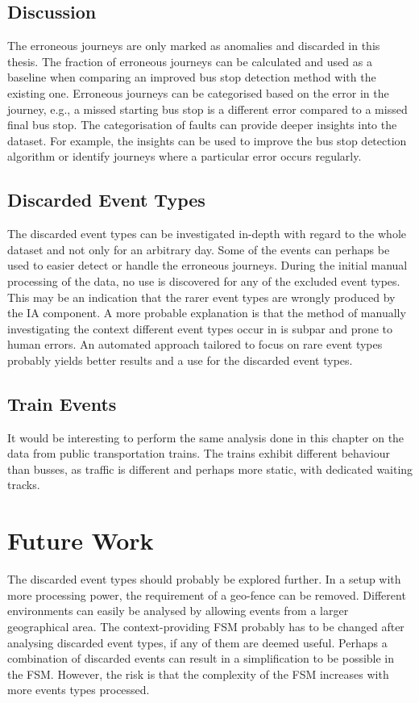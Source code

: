 \subsection{Discussion}
The erroneous journeys are only marked as anomalies and discarded in this thesis.
The fraction of erroneous journeys can be calculated and used as a baseline when comparing an improved bus stop detection method with the existing one.
Erroneous journeys can be categorised based on the error in the journey, e.g., a missed starting bus stop is a different error compared to a missed final bus stop.
The categorisation of faults can provide deeper insights into the dataset.
For example, the insights can be used to improve the bus stop detection algorithm or identify journeys where a particular error occurs regularly.

\subsection{Discarded Event Types}
The discarded event types can be investigated in-depth with regard to the whole dataset and not only for an arbitrary day.
Some of the events can perhaps be used to easier detect or handle the erroneous journeys.
During the initial manual processing of the data, no use is discovered for any of the excluded event types.
This may be an indication that the rarer event types are wrongly produced by the IA component.
A more probable explanation is that the method of manually investigating the context different event types occur in is subpar and prone to human errors.
An automated approach tailored to focus on rare event types probably yields better results and a use for the discarded event types.

\subsection{Train Events}
It would be interesting to perform the same analysis done in this chapter on the data from public transportation trains.
The trains exhibit different behaviour than busses, as traffic is different and perhaps more static, with dedicated waiting tracks.

\section{Future Work}
The discarded event types should probably be explored further.
In a setup with more processing power, the requirement of a geo-fence can be removed.
Different environments can easily be analysed by allowing events from a larger geographical area.
The context-providing FSM probably has to be changed after analysing discarded event types, if any of them are deemed useful.
Perhaps a combination of discarded events can result in a simplification to be possible in the FSM.
However, the risk is that the complexity of the FSM increases with more events types processed.